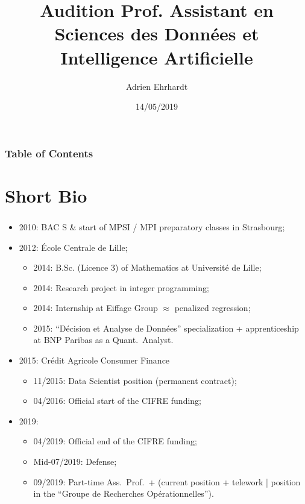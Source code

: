 \documentclass[english,xcolor={rgb,dvipsnames,table,usenames}]{beamer}
\title[Prof. Assist. DIX]{Audition Prof. Assistant en Sciences des Données et Intelligence Artificielle}
\author{Adrien Ehrhardt}
\institute[CACF - Inria]
{

\normalsize

}
\date{14/05/2019} %
\begin{document}

\frame[plain]{\titlepage}



\begin{frame}
\frametitle{Table of Contents}
\tableofcontents[hideallsubsections]
\end{frame}



\section{Short Bio}

\begin{frame}
\frametitle{\secname}

\begin{itemize}
\item<1-> 2010: BAC S \& start of MPSI / MPI preparatory classes in Strasbourg;
\item<2-> 2012: \'Ecole Centrale de Lille;
\begin{itemize}
\item 2014: B.Sc. (Licence 3) of Mathematics at Université de Lille;
\item 2014: Research project in integer programming;
\item 2014: Internship at Eiffage Group $\approx$ penalized regression;
\item 2015: ``Décision et Analyse de Données'' specialization + apprenticeship at BNP Paribas as a Quant.\ Analyst.
\end{itemize}
\item<3-> 2015: Crédit Agricole Consumer Finance
\begin{itemize}
\item 11/2015: Data Scientist position (permanent contract);
\item 04/2016: Official start of the CIFRE funding;
\end{itemize}
\item<4-> 2019: 
\begin{itemize}
\item 04/2019: Official end of the CIFRE funding;
\item Mid-07/2019: Defense;
\item 09/2019: Part-time Ass.\ Prof.\ + (current position + telework | position in the ``Groupe de Recherches Opérationnelles'').
\end{itemize}
\end{itemize}


\end{frame}
\end{document}
